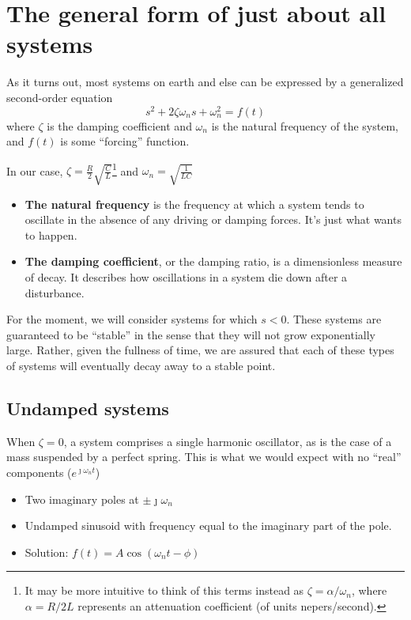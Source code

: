 \documentclass[11pt]{book}
\begin{document}
\newpage
\section{The general form of just about all systems}
As it turns out, most systems on earth and else can be expressed by a generalized second-order equation 
\begin{equation}
	s^2 + 2\zeta\omega_n s  + \omega_n^2 = f(t)
\end{equation} 
where $\zeta$ is the damping coefficient and $\omega_n$ is the natural frequency of the system, and $f(t)$ is some ``forcing'' function.

In our case, $\zeta = \frac{R}{2}\sqrt{\frac{C}{L}}$\footnote{It may be more intuitive to think of this terms instead as $\zeta = \alpha/\omega_n$, where $\alpha = R/2L$ represents an attenuation coefficient (of units nepers/second).} and $\omega_n = \sqrt{\frac{1}{LC}}$



\begin{itemize}
	\item \textbf{The natural frequency} is the frequency at which a system tends to oscillate in the absence of any driving or damping forces. It's just what wants to happen.
	\item \textbf{The damping coefficient}, or the damping ratio, is a dimensionless measure of decay. It describes how oscillations in a system die down after a disturbance.
\end{itemize}

For the moment, we will consider systems for which $s < 0$. These systems are guaranteed to be ``stable'' in the sense that they will not grow exponentially large. Rather, given the fullness of time, we are assured that each of these types of systems will eventually decay away to a stable point.

\subsection{Undamped systems}
When $\zeta = 0$, a system comprises a single harmonic oscillator, as is the case of a mass suspended by a perfect spring. This is what we would expect with no ``real'' components ($e^{\jmath \omega_n t}$) 
\begin{itemize}
	\item Two imaginary poles at $\pm \jmath \omega_n$
	\item Undamped sinusoid with frequency equal to the imaginary part of the pole. 
	\item Solution: $f(t) = A\cos (\omega_n t - \phi)$
\end{itemize}
\end{document}
